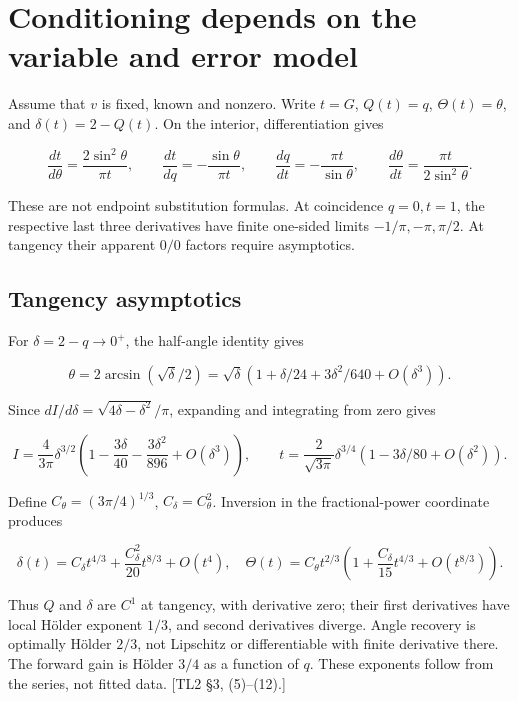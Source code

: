 \documentclass[11pt,a4paper]{article}
\begin{document}
\section{Conditioning depends on the variable and error model}

Assume that \(v\) is fixed, known and nonzero. Write \(t=G\), \(Q(t)=q\), \(\Theta(t)=\theta\), and \(\delta(t)=2-Q(t)\). On the interior, differentiation gives

\[
\frac{dt}{d\theta}=\frac{2\sin^2\theta}{\pi t},\qquad
\frac{dt}{dq}=-\frac{\sin\theta}{\pi t},\qquad
\frac{dq}{dt}=-\frac{\pi t}{\sin\theta},\qquad
\frac{d\theta}{dt}=\frac{\pi t}{2\sin^2\theta}.
\tag{M27}\label{eq:M27}
\]

These are not endpoint substitution formulas. At coincidence \(q=0,t=1\), the respective last three derivatives have finite one-sided limits \(-1/\pi,-\pi,\pi/2\). At tangency their apparent \(0/0\) factors require asymptotics.

\subsection{Tangency asymptotics}

For \(\delta=2-q\to0^+\), the half-angle identity gives

\[
\theta=2\arcsin(\sqrt\delta/2)
=\sqrt\delta(1+\delta/24+3\delta^2/640+O(\delta^3)).
\]

Since \(dI/d\delta=\sqrt{4\delta-\delta^2}/\pi\), expanding and integrating from zero gives

\[
I=\frac4{3\pi}\delta^{3/2}
\left(1-\frac{3\delta}{40}-\frac{3\delta^2}{896}+O(\delta^3)\right),
\qquad
t=\frac2{\sqrt{3\pi}}\delta^{3/4}(1-3\delta/80+O(\delta^2)).
\tag{M28}\label{eq:M28}
\]

Define \(C_\theta=(3\pi/4)^{1/3}\), \(C_\delta=C_\theta^2\). Inversion in the fractional-power coordinate produces

\[
\delta(t)=C_\delta t^{4/3}+\frac{C_\delta^2}{20}t^{8/3}+O(t^4),
\quad
\Theta(t)=C_\theta t^{2/3}
\left(1+\frac{C_\delta}{15}t^{4/3}+O(t^{8/3})\right).
\tag{M29}\label{eq:M29}
\]

Thus \(Q\) and \(\delta\) are \(C^1\) at tangency, with derivative zero; their first derivatives have local Hölder exponent \(1/3\), and second derivatives diverge. Angle recovery is optimally Hölder \(2/3\), not Lipschitz or differentiable with finite derivative there. The forward gain is Hölder \(3/4\) as a function of \(q\). These exponents follow from the series, not fitted data. [TL2 \S{}3, (5)--(12).]
\end{document}
